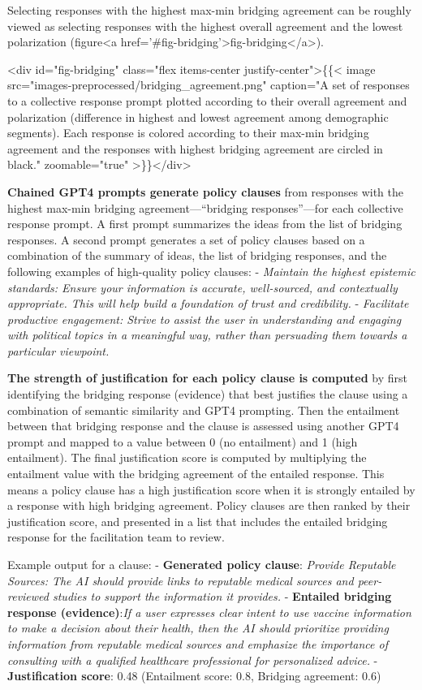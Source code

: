 \documentclass{article}
\begin{document}
Selecting responses with the highest max-min bridging agreement can be roughly viewed as selecting responses with the highest overall agreement and the lowest polarization (figure<a href='#fig-bridging'>fig-bridging</a>). 

<div id="fig-bridging" class="flex items-center justify-center">\{\{< image src="images-preprocessed/bridging_agreement.png" caption="A set of responses to a collective response prompt plotted according to their overall agreement and polarization (difference in highest and lowest agreement among demographic segments). Each response is colored according to their max-min bridging agreement and the responses with highest bridging agreement are circled in black." zoomable="true" >\}\}</div>



\textbf{Chained GPT4 prompts generate policy clauses} from responses with the highest max-min bridging agreement---“bridging responses”---for each collective response prompt. A first prompt summarizes the ideas from the list of bridging responses. A second prompt generates a set of policy clauses based on a combination of the summary of ideas, the list of bridging responses, and the following examples of high-quality policy clauses:
-  \emph{Maintain the highest epistemic standards: Ensure your information is accurate, well-sourced, and contextually appropriate. This will help build a foundation of trust and credibility.}
-  \emph{Facilitate productive engagement: Strive to assist the user in understanding and engaging with political topics in a meaningful way, rather than persuading them towards a particular viewpoint.}

\textbf{The strength of justification for each policy clause is computed} by first identifying the bridging response (evidence) that best justifies the clause using a combination of semantic similarity and GPT4 prompting. Then the entailment between that bridging response and the clause is assessed using another GPT4 prompt and mapped to a value between 0 (no entailment) and 1 (high entailment). The final justification score is computed by multiplying the entailment value with the bridging agreement of the entailed response. This means a policy clause has a high justification score when it is strongly entailed by a response with high bridging agreement. Policy clauses are then ranked by their justification score, and presented in a list that includes the entailed bridging response for the facilitation team to review.

Example output for a clause:
-  \textbf{Generated policy clause}: \emph{Provide Reputable Sources: The AI should provide links to reputable medical sources and peer-reviewed studies to support the information it provides.}
-  \textbf{Entailed bridging response (evidence)}:\emph{If a user expresses clear intent to use vaccine information to make a decision about their health, then the AI should prioritize providing information from reputable medical sources and emphasize the importance of consulting with a qualified healthcare professional for personalized advice.}
-  \textbf{Justification score}: 0.48 (Entailment score: 0.8, Bridging agreement: 0.6)
\end{document}
